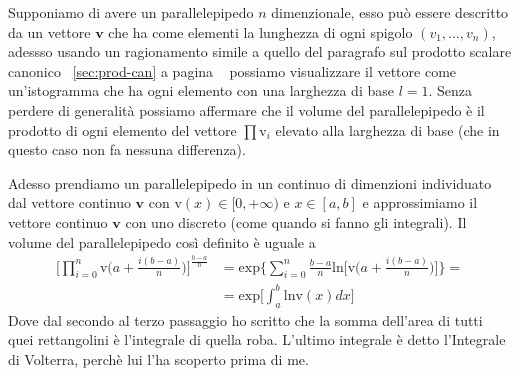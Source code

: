 \documentclass[11pt,a4paper]{report}
\newcommand{\vettore}[1]{\mathbf{#1}}
\newcommand{\vettorec}[1]{\textrm{#1}}
\theoremstyle{definition}
\theoremstyle{plain}
\theoremstyle{plain}
\begin{document}
			Supponiamo di avere un parallelepipedo $n$ dimenzionale, esso può essere descritto da un vettore $\vettore v$ che ha come elementi la lunghezza di ogni spigolo $(v_1,\dots,v_n)$, adessso usando un ragionamento simile a quello del paragrafo sul prodotto scalare canonico ~\ref{sec:prod-can} a pagina ~\pageref{sec:prod-can} possiamo visualizzare il vettore come un'istogramma che ha ogni elemento con una larghezza di base $l=1$.\newline
			Senza perdere di generalità possiamo affermare che il volume del parallelepipedo è il prodotto di ogni elemento del vettore $\prod \vettorec v_i$ elevato alla larghezza di base (che in questo caso non fa nessuna differenza).\newline

			Adesso prendiamo un parallelepipedo in un continuo di dimenzioni individuato dal vettore continuo $\vettore v$ con $\vettorec v(x)\in[0,+\infty)$ e $x\in[a,b]$ e approssimiamo il vettore continuo $\vettore v$ con uno discreto (come quando si fanno gli integrali).\newline
			Il volume del parallelepipedo così definito è uguale a
			\begin{equation}
			\label{eq:volterra}
			\begin{split}
				\Bigg[\prod_{i=0}^n \vettorec v\bigg(a+\frac{i(b-a)}{n}\bigg)\Bigg]^{\frac{b-a}{n}}&=
				\textrm{exp}\Bigg\{\sum_{i=0}^n\frac{b-a}{n}\textrm{ln}\bigg[\vettorec v\bigg(a+\frac{i(b-a)}{n}\bigg)\bigg]\Bigg\}=\\
				&=\textrm{exp}\bigg[\int_a^b \textrm{ln}\vettorec v(x)dx\bigg]
			\end{split}
			\end{equation}
			Dove dal secondo al terzo passaggio ho scritto che la somma dell'area di tutti quei rettangolini è l'integrale di quella roba.\newline
			L'ultimo integrale è detto l'Integrale di Volterra, perchè lui l'ha scoperto prima di me.
\end{document}
